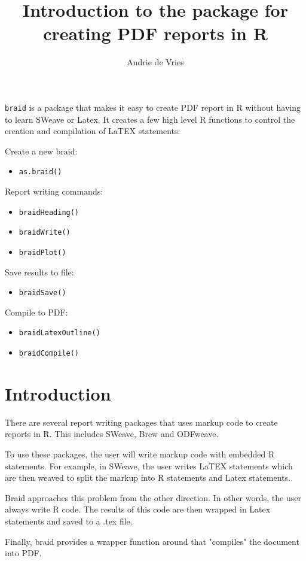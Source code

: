 \documentclass[a4paper]{article}
\title{Introduction to the \braid{} package for creating PDF reports in R}
\author{Andrie de Vries}
\newcommand{\braid}{{\tt braid}}
\newcommand{\code}[1]{{\tt #1}}
\begin{document}
\maketitle

\braid{} is a package that makes it easy to create PDF report in R without having to learn SWeave or Latex.  It creates a few high level R functions to control the creation and compilation of LaTEX statements:

Create a new braid: 
\begin{itemize}
	\item \code{as.braid()}
\end{itemize}

Report writing commands:
\begin{itemize}
	\item \code{braidHeading()}
	\item \code{braidWrite()}
	\item \code{braidPlot()}
\end{itemize}

Save results to file:
\begin{itemize}
	\item \code{braidSave()}
\end{itemize}

Compile to PDF:
\begin{itemize}
	\item \code{braidLatexOutline()}
	\item \code{braidCompile()}
\end{itemize}
	

\section{Introduction}

There are several report writing packages that uses markup code to create reports in R.  This includes SWeave, Brew and ODFweave.

To use these packages, the user will write markup code with embedded R statements.  For example, in SWeave, the user writes LaTEX statements which are then weaved to split the markup into R statements and Latex statements.

Braid approaches this problem from the other direction.  In other words, the user always write R code.  The results of this code are then wrapped in Latex statements and saved to a .tex file.

Finally, braid provides a wrapper function around \code{} that "compiles" the document into PDF.
\end{document}
